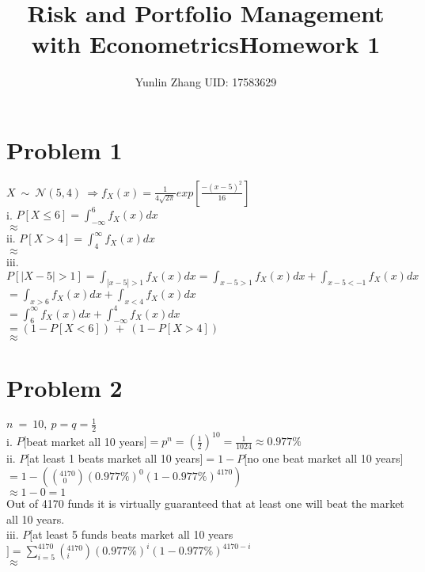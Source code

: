 \documentclass[11pt, oneside]{article}   	%
\title{Risk and Portfolio Management with Econometrics}
\title{Homework 1}
\author{Yunlin Zhang UID: 17583629}
\date{}							%
\begin{document}
\maketitle
\section{Problem 1}
$X\ \sim\ \mathcal{N}(5,4)\ \Rightarrow f_X (x) = \frac{1}{4\sqrt{2\pi}}  exp [{\frac{-(x-5)^2}{16}}]$\\

i. $P[X\leq6]=\int_{-\infty}^{6}f_X (x)dx$\\
\indent\indent$\approx$\\

ii. $P[X>4]=\int_{4}^{\infty}f_X (x)dx$\\
\indent\indent$\approx$\\

iii. $P[|X-5|>1]=\int_{|x-5|>1}f_X (x)dx=\int_{x-5>1} f_X (x)dx + \int_{x-5<-1} f_X (x)dx$\\
\indent\indent$= \int_{x>6} f_X (x)dx + \int_{x<4} f_X (x)dx$\\
\indent\indent$= \int_{6}^{\infty} f_X (x)dx + \int_{-\infty}^{4} f_X (x)dx$\\
\indent\indent$=(1-P[X<6])\ + \ (1-P[X>4])$\\
\indent\indent$\approx $\\

\section{Problem 2}
$n\ = \ 10,\ p=q=\frac{1}{2}$\\

i. $P[$beat market all 10 years$]= p^{n} = (\frac{1}{2})^{10}=\frac{1}{1024} \approx 0.977\%$\\

ii. $P[$at least 1 beats market all 10 years$]=1-P[$no one beat market all 10 years$]$\\
\indent$=1-((_{\ \ 0}^{4170})(0.977\%)^0 (1-0.977\%)^{4170})$\\
\indent$\approx1-0=1$\\
Out of 4170 funds it is virtually guaranteed that at least one will beat the market all 10 years.\\

iii. $P[$at least 5 funds beats market all 10 years$]=\sum_{i=5}^{4170} (_i ^{4170})(0.977\%)^i (1-0.977\%)^{4170-i}$\\
\indent$\approx$\\
\end{document}
